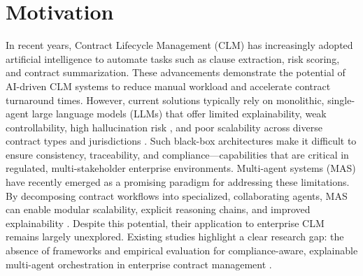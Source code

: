 \section{Motivation}\label{section:motivation}

In recent years, Contract Lifecycle Management (CLM) \cite{wikipedia2025contractlifecyclemanagement} has increasingly adopted artificial intelligence to automate tasks such as clause extraction, risk scoring, and contract summarization. These advancements demonstrate the potential of AI-driven CLM systems to reduce manual workload and accelerate contract turnaround times. However, current solutions typically rely on monolithic, single-agent large language models (LLMs) that offer limited explainability, weak controllability, high hallucination risk \cite{hallucinationlegal}, and poor scalability across diverse contract types and jurisdictions \cite{billi2023largelanguagemodelsexplainable,xia2025parallelismmeetsadaptivenessscalable}. Such black-box architectures make it difficult to ensure consistency, traceability, and compliance—capabilities that are critical in regulated, multi-stakeholder enterprise environments. \cite{blackboxalgorithms,wang2024legalevalutionschallengeslarge}
\newline
\break
Multi-agent systems (MAS) have recently emerged as a promising paradigm for addressing these limitations. By decomposing contract workflows into specialized, collaborating agents, MAS can enable modular scalability, explicit reasoning chains, and improved explainability \cite{shu2024effectivegenaimultiagentcollaboration, wang2024mixtureofagentsenhanceslargelanguage,wang2025lmarslegalmultiagentworkflow}. Despite this potential, their application to enterprise CLM remains largely unexplored. Existing studies highlight a clear research gap: the absence of frameworks and empirical evaluation for compliance-aware, explainable multi-agent orchestration in enterprise contract management \cite{yehudai2025llmagentevaluationregulated, kargwal2025masteringmultiagenteval}.